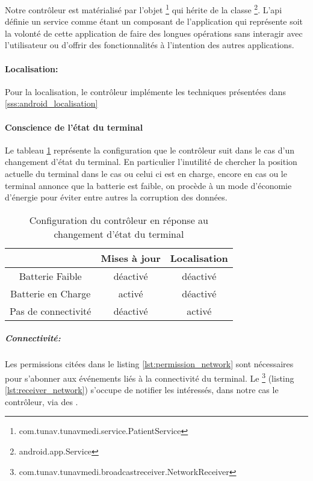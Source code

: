 Notre contrôleur est matérialisé par l'objet
\footnote{com.tunav.tunavmedi.service.PatientService} qui
hérite de la classe \footnote{android.app.Service}. L'\gls{api}
\android{} définie un service comme étant un composant de l'application qui
représente soit la volonté de cette application de faire des longues opérations
sans interagir avec l'utilisateur ou d’offrir des fonctionnalités à
l'intention des autres applications\cite{api:service}.

\paragraph{Localisation:}
Pour la localisation, le contrôleur implémente les techniques présentées dans \ref{sss:android_localisation}

\paragraph{Conscience de l'état du terminal}

Le tableau \ref{tab:status} représente la configuration que le contrôleur suit dans le cas d'un changement d’état du terminal. En particulier l'inutilité de chercher la position actuelle du terminal dans le cas ou celui ci est en charge, encore en cas ou le terminal annonce que la batterie est faible, on procède à un mode d’économie d’énergie pour éviter entre autres la corruption des données.

\begin{table}[H]
\centering
\begin{tabular}{|c|c|c|}
\hline
&\textsf{Mises à jour} & \textsf{Localisation}\\
\hline
\textsf{Batterie Faible} & déactivé & déactivé\\
\hline
\textsf{Batterie en Charge} & activé & déactivé\\
\hline
\textsf{Pas de connectivité} & déactivé & activé\\
\hline
\end{tabular}
\caption{Configuration du contrôleur en réponse au changement d’état du terminal}
\label{tab:status}
\end{table}

\subparagraph{Connectivité:}

Les permissions citées dans le listing \ref{lst:permission_network} sont nécessaires pour s’abonner aux événements liés à la connectivité du terminal. Le \footnote{com.tunav.tunavmedi.broadcastreceiver.NetworkReceiver} (listing \ref{lst:receiver_network}) s'occupe de notifier les intéressés, dans notre cas le contrôleur, via des .

